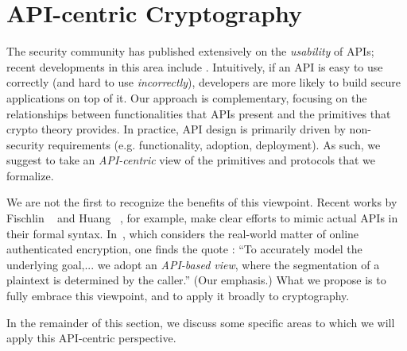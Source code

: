 \section{API-centric Cryptography}
The security community has published extensively on the \emph{usability} of
APIs; recent developments in this area include \cite{ABF+,HHL+17,IKND16}.
Intuitively, if an API is easy to use correctly (and hard to use
\emph{incorrectly}), developers are more likely to build secure applications on
top of it.
%
Our approach is complementary, focusing on the relationships between
functionalities that APIs present and the primitives that crypto theory
provides. In practice, API design is primarily driven by non-security
requirements (e.g. functionality, adoption, deployment).
%
As such, we suggest to take an
\emph{API-centric} view of the primitives and protocols that we
formalize.  

We are not the first to recognize the benefits of this viewpoint.
Recent works by Fischlin \etal~\cite{FPMG15} and Huang
\etal~\cite{HRRV15}, for example, make clear efforts to mimic actual
APIs in their formal syntax.  In~\cite{HRRV15}, which considers the
real-world matter of online authenticated encryption, one finds the quote : ``To
accurately model the underlying goal,... we adopt an \emph{API-based
  view}, where the segmentation of a plaintext is determined by the
caller.'' (Our emphasis.)  What we propose is to fully embrace this
viewpoint, and to apply it broadly to cryptography.

In
the remainder of this section, we discuss some specific areas to which we will apply
this API-centric perspective.
%


